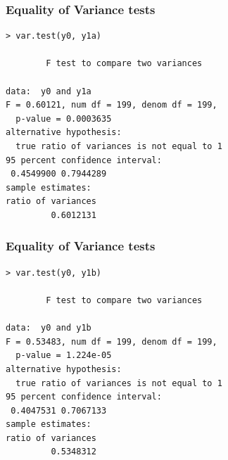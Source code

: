 \documentclass[14pt]{beamer}
\newcommand{\questions}{\frame{\vspace{4em}\centering{\Large Questions?}}}
\begin{document}
\begin{frame}[fragile]

\frametitle{Equality of Variance tests}

\footnotesize

\begin{verbatim}
> var.test(y0, y1a)

        F test to compare two variances

data:  y0 and y1a
F = 0.60121, num df = 199, denom df = 199, 
  p-value = 0.0003635
alternative hypothesis: 
  true ratio of variances is not equal to 1
95 percent confidence interval:
 0.4549900 0.7944289
sample estimates:
ratio of variances 
         0.6012131 
\end{verbatim}

\end{frame}

\begin{frame}[fragile]

\frametitle{Equality of Variance tests}

\footnotesize

\begin{verbatim}
> var.test(y0, y1b)

        F test to compare two variances

data:  y0 and y1b
F = 0.53483, num df = 199, denom df = 199,
  p-value = 1.224e-05
alternative hypothesis:
  true ratio of variances is not equal to 1
95 percent confidence interval:
 0.4047531 0.7067133
sample estimates:
ratio of variances 
         0.5348312
\end{verbatim}

\end{frame}


\questions



\end{document}
